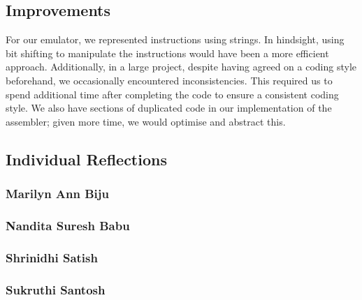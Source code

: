 \documentclass[11pt]{article}
\begin{document}
\subsection{Improvements}

For our emulator, we represented instructions using strings. In hindsight, using bit shifting to manipulate the instructions would have been a more efficient approach. Additionally, in a large project, despite having agreed on a coding style beforehand, we occasionally encountered inconsistencies. This required us to spend additional time after completing the code to ensure a consistent coding style. We also have sections of duplicated code in our implementation of the assembler; given more time, we would optimise and abstract this.

\subsection{Individual Reflections}

\subsubsection{Marilyn Ann Biju}

\subsubsection{Nandita Suresh Babu}

\subsubsection{Shrinidhi Satish}

\subsubsection{Sukruthi Santosh}
\end{document}
